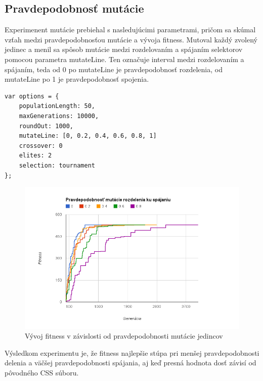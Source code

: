 
\subsection{Pravdepodobnosť mutácie} %
\label{sub:pravdepodobnos_mut_cie}

Experimenent mutácie prebiehal s nasledujúcimi parametrami, pričom sa skúmal vzťah medzi pravdepodobnosťou mutácie a vývoja fitness. Mutoval každý zvolený jedinec a menil sa spôsob mutácie medzi rozdelovaním a spájaním selektorov pomocou parametra mutateLine. Ten označuje interval medzi rozdelovaním a spájaním, teda od 0 po mutateLine je pravdepodobnosť rozdelenia, od mutateLine po 1 je pravdepodobnosť spojenia.

\begin{verbatim}
var options = {
    populationLength: 50,
    maxGenerations: 10000,
    roundOut: 1000,
    mutateLine: [0, 0.2, 0.4, 0.6, 0.8, 1]
    crossover: 0
    elites: 2
    selection: tournament
};
\end{verbatim}

\begin{figure}[H]
	\centering
	\includegraphics[width=1.0\textwidth]{mutation.png}
	\caption[Vývoj fitness v závislosti od pravdepodobnosti mutácie jedincov]{
		Vývoj fitness v závislosti od pravdepodobnosti mutácie jedincov}
	\label{fig: selection}
\end{figure}

Výsledkom experimentu je, že fitness najlepšie stúpa pri menšej pravdepodobnosti delenia a väčšej pravdepodobnosti spájania, aj keď presná hodnota dosť závisí od pôvodného CSS súboru.

